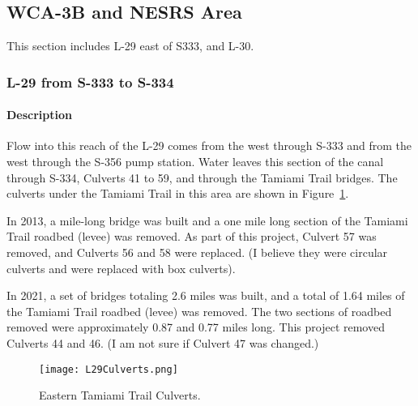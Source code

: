 \subsection{WCA-3B and NESRS Area}
This section includes L-29 east of S333, and L-30.


\subsubsection{L-29 from S-333 to S-334}
\label{sec:L29fromS333toS334}

\paragraph{Description}
Flow into this reach of the L-29 comes from the west through S-333 and from the west through the S-356 pump station. Water leaves this section of the canal through S-334, Culverts 41 to 59, and through the Tamiami Trail bridges. The culverts under the Tamiami Trail in this area are shown in Figure~\ref{fig:L29Culverts}.

In 2013, a mile-long bridge was built and a one mile long section of the Tamiami Trail roadbed (levee) was removed. As part of this project, Culvert 57 was removed, and Culverts 56 and 58 were replaced. (I believe they were circular culverts and were replaced with box culverts).

In 2021, a set of bridges totaling 2.6 miles was built, and a total of 1.64 miles of the Tamiami Trail roadbed (levee) was removed. The two sections of roadbed removed were approximately 0.87 and 0.77 miles long.  This project removed Culverts 44 and 46. (I am not sure if Culvert 47 was changed.)

\begin{figure}[!h]
  \begin{center}
  \texttt{[image: L29Culverts.png]}
  \caption{Eastern Tamiami Trail Culverts.}
  \label{fig:L29Culverts}
  \end{center}
\end{figure}

